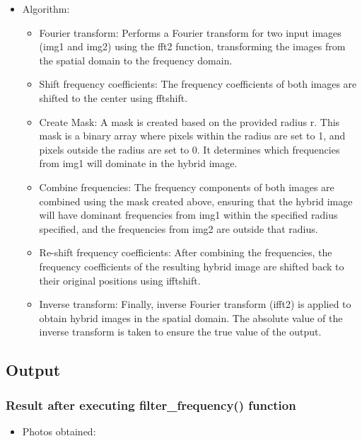\documentclass{article}
\begin{document}
\begin{itemize}
    
    \item Algorithm:
    \begin{itemize}
        \item Fourier transform: Performs a Fourier transform for two input images (img1 and img2) using the fft2 function, transforming the images from the spatial domain to the frequency domain.
        \item Shift frequency coefficients: The frequency coefficients of both images are shifted to the center using fftshift.
        \item Create Mask: A mask is created based on the provided radius r. This mask is a binary array where pixels within the radius are set to 1, and pixels outside the radius are set to 0. It determines which frequencies from img1 will dominate in the hybrid image.
        \item Combine frequencies: The frequency components of both images are combined using the mask created above, ensuring that the hybrid image will have dominant frequencies from img1 within the specified radius specified, and the frequencies from img2 are outside that radius.
        \item Re-shift frequency coefficients: After combining the frequencies, the frequency coefficients of the resulting hybrid image are shifted back to their original positions using ifftshift.
        \item Inverse transform: Finally, inverse Fourier transform (ifft2) is applied to obtain hybrid images in the spatial domain. The absolute value of the inverse transform is taken to ensure the true value of the output.
    \end{itemize}
\end{itemize}



\subsection{Output}
\subsubsection{Result after executing filter\_frequency() function}
\begin{itemize}
    \item Photos obtained:
\end{itemize}
\end{document}
